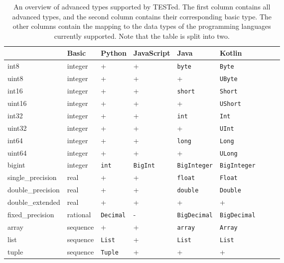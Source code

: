 \documentclass[../main]{subfiles}
\begin{document}
\begin{table}
    \caption{
        An overview of advanced types supported by TESTed.
        The first column contains all advanced types, and the second column contains their corresponding basic type.
        The other columns contain the mapping to the data types of the programming languages currently supported.
        Note that the table is split into two.
    }
    \begin{wide}
        \small\setlength{\tabcolsep}{0.5\tabcolsep}%
        \begin{tabular}{|l|l|l|l|l|l|l|l|l|}
            \hline
            \tested{}         & Basic & Python         & JavaScript       & Java             & Kotlin   \\
            \hline
            int8              & integer & + & + & \texttt{byte} & \texttt{Byte} \\
            uint8             & integer & + & + & + & \texttt{UByte} \\
            int16             & integer & + & + & \texttt{short} & \texttt{Short} \\
            uint16 & integer & + & + & + & \texttt{UShort} \\
            int32 & integer & + & + & \texttt{int} & \texttt{Int} \\
            uint32 & integer & + & + & + & \texttt{UInt} \\
            int64 & integer & + & + & \texttt{long} & \texttt{Long} \\
            uint64 & integer  & + & + & + & \texttt{ULong} \\
            bigint & integer  & \texttt{int} & \texttt{BigInt} & \texttt{BigInteger}
            & \texttt{BigInteger} \\
            single\_precision & real & + & + & \texttt{float} & \texttt{Float} \\
            double\_precision & real & + & + & \texttt{double} & \texttt{Double} \\
            double\_extended & real & + & + & + & + \\
            fixed\_precision & rational & \texttt{Decimal} & - & \texttt{BigDecimal}
            & \texttt{BigDecimal} \\
            array & sequence & + & + & \texttt{array} & \texttt{Array} \\
            list & sequence & \texttt{List} & + & \texttt{List} & \texttt{List} \\
            tuple & sequence & \texttt{Tuple} & + & + & + \\

\end{tabular}
\end{wide}
\end{table}
\end{document}
